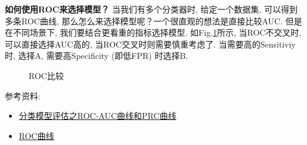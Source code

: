 \textbf{如何使用ROC来选择模型？}\newline
当我们有多个分类器时, 给定一个数据集, 可以得到多条ROC曲线, 那么怎么来选择模型呢？一个很直观的想法是直接比较AUC. 但是在不同场景下, 我们要结合更看重的指标选择模型. 如Fig.\ref{fig:roc-cmp}所示, 当ROC不交叉时, 可以直接选择AUC高的, 当ROC交叉时则需要慎重考虑了. 当需要高的Sensitiviy时, 选择A, 需要高Specificity (即低FPR) 时选择B. 


\begin{figure}[h]
	\centering
	\quad
	\caption{ROC比较}
	\label{fig:roc-cmp}
\end{figure}

参考资料: 
\begin{itemize}
	\item \href{https://blog.csdn.net/pipisorry/article/details/51788927}{分类模型评估之ROC-AUC曲线和PRC曲线}
	\item \href{https://zh.wikipedia.org/zh/ROC%E6%9B%B2%E7%BA%BF}{ROC曲线}
\end{itemize}


